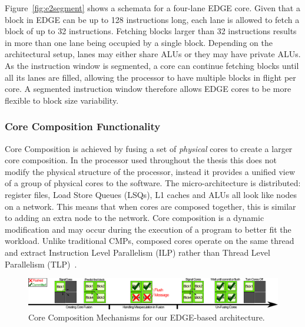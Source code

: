Figure~\ref{fig:e2segment} shows a schemata for a four-lane EDGE core.
Given that a block in EDGE can be up to 128 instructions long, each lane is allowed to fetch a block of up to 32 instructions.
Fetching blocks larger than 32 instructions results in more than one lane being occupied by a single block.
Depending on the architectural setup, lanes may either share ALUs or they may have private ALUs.
As the instruction window is segmented, a core can continue fetching blocks until all its lanes are filled, allowing the processor to have multiple blocks in flight per core.
A segmented instruction window therefore allows EDGE cores to be more flexible to block size variability.

\subsubsection{Core Composition Functionality}\label{chp:Background:sec:EDGE}

Core Composition is achieved by fusing a set of \textit{physical} cores to create a larger core composition.
In the processor used throughout the thesis this does not modify the physical structure of the processor, instead it provides a unified view of a group of physical cores to the software.
The micro-architecture is distributed: register files, Load Store Queues (LSQs), L1 caches and ALUs all look like nodes on a network.
This means that when cores are composed together, this is similar to adding an extra node to the network.
Core composition is a dynamic modification and may occur during the execution of a program to better fit the workload.
Unlike traditional CMPs, composed cores operate on the same thread and extract Instruction Level Parallelism (ILP) rather than Thread Level Parallelism (TLP)~\cite{micolet2016dmpstream,pricopi2012bahurupi}.

\begin{figure}
 \center
 \includegraphics[width=1\textwidth]{cases-paper/graphics/background/proc_test.pdf}
 \caption{Core Composition Mechanisms for our EDGE-based architecture.}\label{fig:dmp}
 \end{figure}
 

